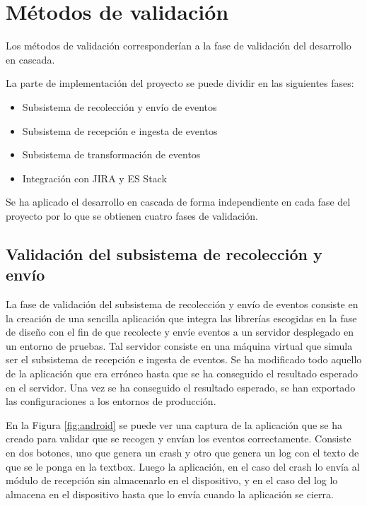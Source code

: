 \section{Métodos de validación}

Los métodos de validación corresponderían a la fase de validación del desarrollo en cascada.

La parte de implementación del proyecto se puede dividir en las siguientes fases:

\begin{itemize}
	\item Subsistema de recolección y envío de eventos
	\item Subsistema de recepción e ingesta de eventos
	\item Subsistema de transformación de eventos
	\item Integración con JIRA y ES Stack
\end{itemize}

Se ha aplicado el desarrollo en cascada de forma independiente en cada fase del proyecto por lo que se obtienen cuatro fases de validación.

\subsection{Validación del subsistema de recolección y envío}
La fase de validación del subsistema de recolección y envío de eventos consiste en la creación de una sencilla aplicación que integra las librerías escogidas en la fase de diseño con el fin de que recolecte y envíe eventos a un servidor desplegado en un entorno de pruebas. Tal servidor consiste en una máquina virtual que simula ser el subsistema de recepción e ingesta de eventos. Se ha modificado todo aquello de la aplicación que era erróneo hasta que se ha conseguido el resultado esperado en el servidor. Una vez se ha conseguido el resultado esperado, se han exportado las configuraciones a los entornos de producción.


En la Figura \ref{fig:android} se puede ver una captura de la aplicación que se ha creado para validar que se recogen y envían los eventos correctamente. Consiste en dos botones, uno que genera un crash y otro que genera un log con el texto de que se le ponga en la textbox. Luego la aplicación, en el caso del crash lo envía al módulo de recepción sin almacenarlo en el dispositivo, y en el caso del log lo almacena en el dispositivo hasta que lo envía cuando la aplicación se cierra.

